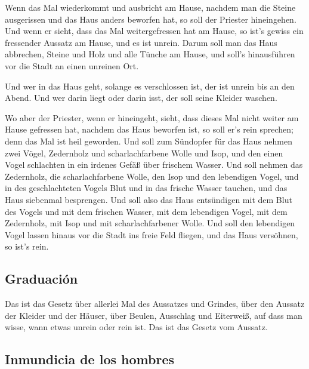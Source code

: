  Wenn das Mal wiederkommt und ausbricht am Hause, nachdem
man die Steine ausgerissen und das Haus anders beworfen hat,
 so soll der Priester hineingehen. Und wenn er sieht,
dass das Mal weitergefressen hat am Hause, so ist's gewiss ein
fressender Aussatz am Hause, und es ist unrein.  Darum
soll man das Haus abbrechen, Steine und Holz und alle Tünche am Hause,
und soll's hinausführen vor die Stadt an einen unreinen Ort.

 Und wer in das Haus geht, solange es verschlossen ist,
der ist unrein bis an den Abend.  Und wer darin liegt
oder darin isst, der soll seine Kleider waschen.

 Wo aber der Priester, wenn er hineingeht, sieht, dass
dieses Mal nicht weiter am Hause gefressen hat, nachdem das Haus
beworfen ist, so soll er's rein sprechen; denn das Mal ist heil
geworden.  Und soll zum Sündopfer für das Haus nehmen
zwei Vögel, Zedernholz und scharlachfarbene Wolle und Isop,
 und den einen Vogel schlachten in ein irdenes Gefäß über
frischem Wasser.  Und soll nehmen das Zedernholz, die
scharlachfarbene Wolle, den Isop und den lebendigen Vogel, und in des
geschlachteten Vogels Blut und in das frische Wasser tauchen, und das
Haus siebenmal besprengen.  Und soll also das Haus
entsündigen mit dem Blut des Vogels und mit dem frischen Wasser, mit dem
lebendigen Vogel, mit dem Zedernholz, mit Isop und mit scharlachfarbener
Wolle.  Und soll den lebendigen Vogel lassen hinaus vor
die Stadt ins freie Feld fliegen, und das Haus versöhnen, so ist's rein.

\hypertarget{graduaciuxf3n}{%
\subsection{Graduación}\label{graduaciuxf3n}}

 Das ist das Gesetz über allerlei Mal des Aussatzes und
Grindes,  über den Aussatz der Kleider und der Häuser,
 über Beulen, Ausschlag und Eiterweiß, 
auf dass man wisse, wann etwas unrein oder rein ist. Das ist das Gesetz
vom Aussatz.

\hypertarget{inmundicia-de-los-hombres}{%
\subsection{Inmundicia de los hombres}\label{inmundicia-de-los-hombres}}

